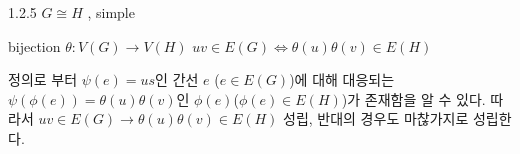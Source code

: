 \documentclass{oblivoir}
\begin{document}
1.2.5
$G \cong H$ , simple

bijection $\theta : V(G) \longrightarrow V(H)$
$ uv \in E(G) \Leftrightarrow  \theta(u)\theta(v) \in E(H)$

정의로 부터 $\psi(e) = us$인 간선 $e$ ($e \in E(G)$)에 대해 대응되는 $\psi(\phi(e)) = \theta(u)\theta(v)$인 $\phi(e)$($\phi(e) \in E(H)$)가 존재함을 알 수 있다. 따라서 $ uv \in E(G) \rightarrow  \theta(u)\theta(v) \in E(H)$ 성립, 반대의 경우도 마찮가지로 성립한다.
\end{document}
